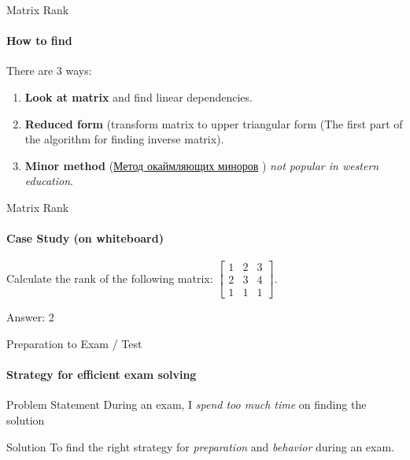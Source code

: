 \documentclass[aspectratio=169,notes]{beamer}
\begin{document}
\begin{frame}[t]{Matrix Rank}
\framesubtitle{How to find}
    There are 3 ways:
    \begin{enumerate}
        \item \textbf{Look at matrix} and find linear dependencies.
        \item \textbf{Reduced form} (transform matrix to upper triangular form (The first part of the algorithm for finding inverse matrix).
        \item \textbf{Minor method} (\href{http://www.mathprofi.ru/rang_matricy.html}{Метод окаймляющих миноров} ) \textit{not popular in western education}.
    \end{enumerate}
\end{frame}

\begin{frame}[t]{Matrix Rank}
\framesubtitle{Case Study (on whiteboard)}
Calculate the rank of the following matrix: $\begin{bmatrix}1&2&3\\2&3&4\\1&1&1\end{bmatrix}$. \medskip

\alert{\Large Answer: 2}
\end{frame}



\begin{frame}[t]{Preparation to Exam / Test}
\framesubtitle{Strategy for efficient exam solving}
\begin{exampleblock}{Problem Statement}
    During an exam, I \textit{spend too much time} on finding the solution
\end{exampleblock}
\begin{alertblock}{Solution}
    To find the right strategy for \textit{preparation} and \textit{behavior} during an exam.
\end{alertblock}
\end{frame}
\end{document}
